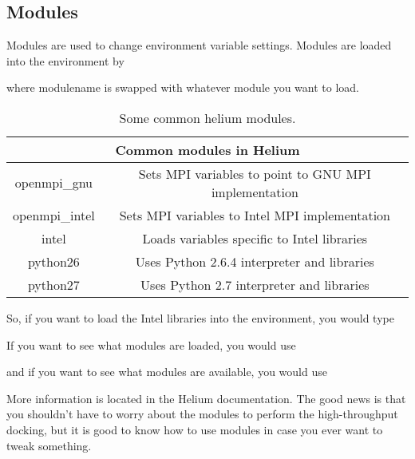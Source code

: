 \subsection{Modules}
Modules are used to change environment variable settings. Modules are loaded into the environment by
\begin{quote}
\end{quote}

where modulename is swapped with whatever module you want to load. 

\begin{table}
  \centering
  \begin{tabular}{|c|c|}
  \hline
  \multicolumn{2}{|c|}{Common modules in Helium} \\
  \hline
  openmpi\_gnu & Sets MPI variables to point to GNU MPI implementation \\
  openmpi\_intel & Sets MPI variables to Intel MPI implementation \\
  intel & Loads variables specific to Intel libraries\\
  python26 & Uses Python 2.6.4 interpreter and libraries \\
  python27 & Uses Python 2.7 interpreter and libraries \\
  \hline
  \end{tabular}
\caption{Some common helium modules.}
\end{table}

So, if you want to load the Intel libraries into the environment, you would type

\begin{quote}
\end{quote}


If you want to see what modules are loaded, you would use 

\begin{quote}
\end{quote}

and if you want to see what modules are available, you would use \begin{quote}
\end{quote}

 More information is located in the Helium documentation. The good news is that you shouldn't have to worry about the modules to perform the high-throughput docking, but it is good to know how to use modules in case you ever want to tweak something.

